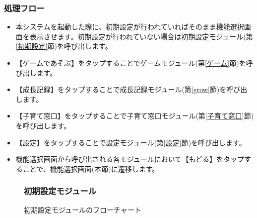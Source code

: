 \documentclass[a4j]{jarticle}
\begin{document}
\subsubsection*{処理フロー}
\begin{itemize}
\item 本システムを起動した際に、初期設定が行われていればそのまま機能選択画面を表示させます。初期設定が行われていない場合は初期設定モジュール(第\ref{初期設定}節)を呼び出します。

\item 【ゲームであそぶ】をタップすることでゲームモジュール(第\ref{ゲーム}節)を呼び出します。

\item 【成長記録】をタップすることで成長記録モジュール(第\ref{grow}節)を呼び出します。

\item 【子育て窓口】をタップすることで子育て窓口モジュール(第\ref{子育て窓口}節)を呼び出します。

\item 【設定】をタップすることで設定モジュール(第\ref{設定}節)を呼び出します。

\item 機能選択画面から呼び出される各モジュールにおいて【もどる】をタップすることで、機能選択画面(本節)に遷移します。
\end{itemize}

\begin{figure}[H]
\subsubsection{初期設定モジュール\label{初期設定}}
    \begin{center}
    \caption {初期設定モジュールのフローチャート}
    \label{initialsetting}
    \end{center}
\end{figure}
\end{document}
